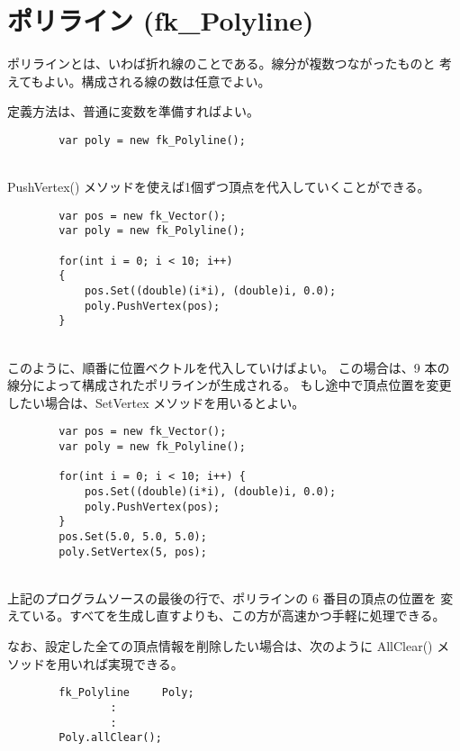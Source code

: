 \section{ポリライン (fk\_Polyline)}
ポリラインとは、いわば折れ線のことである。線分が複数つながったものと
考えてもよい。構成される線の数は任意でよい。

定義方法は、普通に変数を準備すればよい。
\\
\begin{screen}
\begin{verbatim}
        var poly = new fk_Polyline();
\end{verbatim}
\end{screen}
~ \\
PushVertex() メソッドを使えば1個ずつ頂点を代入していくことができる。
\\
\begin{breakbox}
\begin{verbatim}
        var pos = new fk_Vector();
        var poly = new fk_Polyline();

        for(int i = 0; i < 10; i++)
        {
            pos.Set((double)(i*i), (double)i, 0.0);
            poly.PushVertex(pos);
        }
\end{verbatim}
\end{breakbox}
~ \\
このように、順番に位置ベクトルを代入していけばよい。
この場合は、9 本の線分によって構成されたポリラインが生成される。
もし途中で頂点位置を変更したい場合は、SetVertex メソッドを用いるとよい。
\\
\begin{breakbox}
\begin{verbatim}
        var pos = new fk_Vector();
        var poly = new fk_Polyline();

        for(int i = 0; i < 10; i++) {
            pos.Set((double)(i*i), (double)i, 0.0);
            poly.PushVertex(pos);
        }
        pos.Set(5.0, 5.0, 5.0);
        poly.SetVertex(5, pos);
\end{verbatim}
\end{breakbox}
~ \\
上記のプログラムソースの最後の行で、ポリラインの 6 番目の頂点の位置を
変えている。すべてを生成し直すよりも、この方が高速かつ手軽に処理できる。

なお、設定した全ての頂点情報を削除したい場合は、次のように
AllClear() メソッドを用いれば実現できる。
\\
\begin{screen}
\begin{verbatim}
        fk_Polyline     Poly;
                :
                :
        Poly.allClear();
\end{verbatim}
\end{screen}

